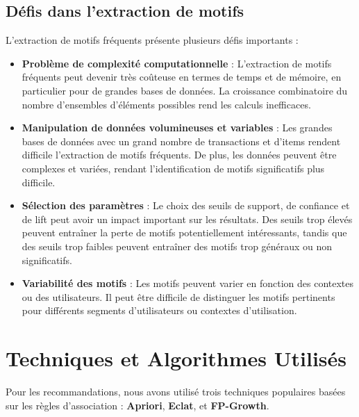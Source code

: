 \documentclass[a4paper, 12pt]{article}
\begin{document}
\subsection{Défis dans l'extraction de motifs}
L'extraction de motifs fréquents présente plusieurs défis importants :
\begin{itemize}
    \item \textbf{Problème de complexité computationnelle} : L'extraction de motifs fréquents peut devenir très coûteuse en termes de temps et de mémoire, en particulier pour de grandes bases de données. La croissance combinatoire du nombre d'ensembles d'éléments possibles rend les calculs inefficaces.
    \item \textbf{Manipulation de données volumineuses et variables} : Les grandes bases de données avec un grand nombre de transactions et d'items rendent difficile l'extraction de motifs fréquents. De plus, les données peuvent être complexes et variées, rendant l'identification de motifs significatifs plus difficile.
    \item \textbf{Sélection des paramètres} : Le choix des seuils de support, de confiance et de lift peut avoir un impact important sur les résultats. Des seuils trop élevés peuvent entraîner la perte de motifs potentiellement intéressants, tandis que des seuils trop faibles peuvent entraîner des motifs trop généraux ou non significatifs.
    \item \textbf{Variabilité des motifs} : Les motifs peuvent varier en fonction des contextes ou des utilisateurs. Il peut être difficile de distinguer les motifs pertinents pour différents segments d'utilisateurs ou contextes d'utilisation.
\end{itemize}


\newpage
\pagestyle{fancy}
\section{Techniques et Algorithmes Utilisés}
\justifying 
Pour les recommandations, nous avons utilisé trois techniques populaires basées sur les règles d'association : \textbf{Apriori}, \textbf{Eclat}, et \textbf{FP-Growth}.


\end{document}
